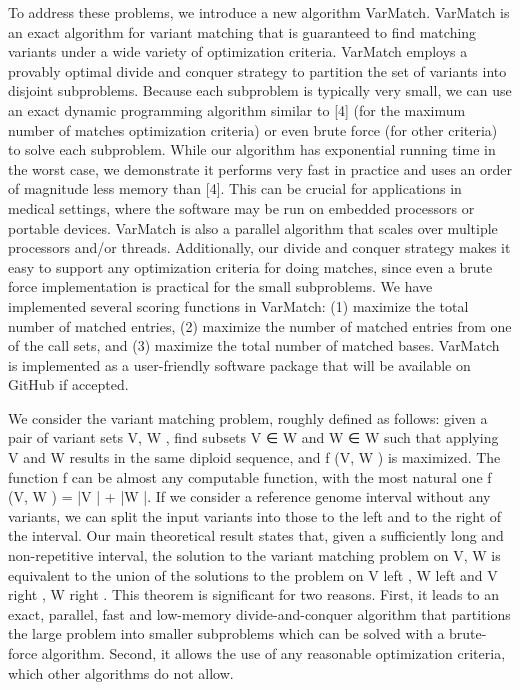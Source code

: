 To address these problems, we introduce a new algorithm VarMatch. VarMatch is an exact algorithm
for variant matching that is guaranteed to find matching variants under a wide variety of optimization
criteria. VarMatch employs a provably optimal divide and conquer strategy to partition the set of variants
into disjoint subproblems. Because each subproblem is typically very small, we can use an exact dynamic
programming algorithm similar to [4] (for the maximum number of matches optimization criteria) or even
brute force (for other criteria) to solve each subproblem. While our algorithm has exponential running
time in the worst case, we demonstrate it performs very fast in practice and uses an order of magnitude
less memory than [4]. This can be crucial for applications in medical settings, where the software may
be run on embedded processors or portable devices. VarMatch is also a parallel algorithm that scales
over multiple processors and/or threads. Additionally, our divide and conquer strategy makes it easy to
support any optimization criteria for doing matches, since even a brute force implementation is practical
for the small subproblems. We have implemented several scoring functions in VarMatch: (1) maximize
the total number of matched entries, (2) maximize the number of matched entries from one of the call
sets, and (3) maximize the total number of matched bases. VarMatch is implemented as a user-friendly
software package that will be available on GitHub if accepted.

We consider the variant matching problem, roughly defined as follows: given a pair of variant sets V, W ,
find subsets V ∈ W and W ∈ W such that applying V and W results in the same diploid sequence, and
f (V, W ) is maximized. The function f can be almost any computable function, with the most natural
one f (V, W ) = |V | + |W |. If we consider a reference genome interval without any variants, we can split
the input variants into those to the left and to the right of the interval. Our main theoretical result states
that, given a sufficiently long and non-repetitive interval, the solution to the variant matching problem
on V, W is equivalent to the union of the solutions to the problem on V left , W left and V right , W right .
This theorem is significant for two reasons. First, it leads to an exact, parallel, fast and low-memory
divide-and-conquer algorithm that partitions the large problem into smaller subproblems which can be
solved with a brute-force algorithm. Second, it allows the use of any reasonable optimization criteria,
which other algorithms do not allow.

